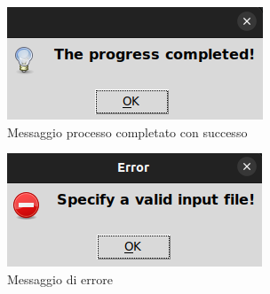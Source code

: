 \begin{figure}[H]
    \centering
    \includegraphics{immagini/progressCompletedDocking.png}
    \caption{Messaggio processo completato con successo}
    \label{fig:progress completed docking}
\end{figure}

\begin{figure}[H]
    \centering
    \includegraphics{immagini/invalidInputDocking.png}
    \caption{Messaggio di errore}
    \label{fig:Invalid input docking}
\end{figure}